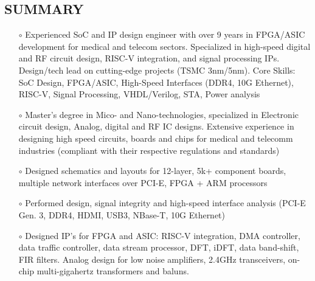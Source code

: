 \documentclass[margin , 10pt]{res} %
\begin{document}
	\thispagestyle{firstpage}
	\vglue 1mm
	\begin{resume}
	\section{SUMMARY}
		\begin{itemize}
			\item[$\circ$] Experienced SoC and IP design engineer with over 9 years in FPGA/ASIC development for medical and telecom sectors. Specialized in high-speed digital and RF circuit design, RISC-V integration, and signal processing IPs. Design/tech lead on cutting-edge projects (TSMC 3nm/5nm).
			Core Skills: SoC Design, FPGA/ASIC, High-Speed Interfaces (DDR4, 10G Ethernet), RISC-V, Signal Processing, VHDL/Verilog, STA, Power analysis
			\item[$\circ$]Master's degree in Mico- and Nano-technologies, specialized in Electronic circuit design, Analog, digital and RF IC designs. Extensive experience in designing high speed circuits, boards and chips for medical and telecomm industries (compliant with their respective regulations and standards) %
			\item[$\circ$] Designed schematics and layouts for 12-layer, 5k+ component boards, multiple network interfaces over PCI-E, FPGA + ARM processors
			\item[$\circ$] Performed design, signal integrity and high-speed interface analysis (PCI-E Gen. 3, DDR4,  HDMI, USB3, NBase-T, 10G Ethernet) 
			\item[$\circ$]Designed IP's for FPGA and ASIC: RISC-V integration, DMA controller, data traffic controller, data stream processor, DFT, iDFT, data band-shift, FIR filters.  Analog design for low noise amplifiers, 2.4GHz transceivers, on-chip multi-gigahertz transformers and baluns. 
		\end{itemize}
		

\end{resume}
\end{document}
